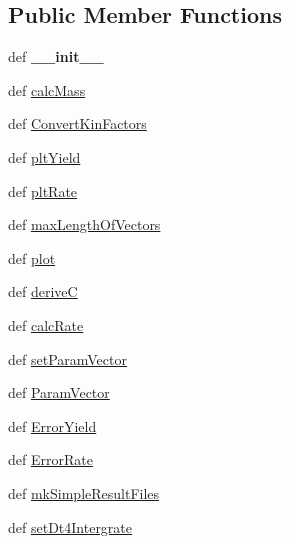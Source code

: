 \subsection*{\-Public \-Member \-Functions}
\begin{DoxyCompactItemize}
\item 
\hypertarget{classModels_1_1ArrheniusModelNoB_ad0a055e1a0bd58308116136d54d16ffb}{def {\bfseries \-\_\-\-\_\-init\-\_\-\-\_\-}}\label{classModels_1_1ArrheniusModelNoB_ad0a055e1a0bd58308116136d54d16ffb}

\item 
def \hyperlink{classModels_1_1ArrheniusModelNoB_ad6e29a334e64d65beb7b0785b2979644}{calc\-Mass}
\item 
def \hyperlink{classModels_1_1ArrheniusModelNoB_a6c26a473f8e08dd6d6651dd0b7c7a8a5}{\-Convert\-Kin\-Factors}
\item 
def \hyperlink{classModels_1_1Model_a317ed848b969dbe3a96dd05e8b771900}{plt\-Yield}
\item 
def \hyperlink{classModels_1_1Model_aa35c741babf8f141df48c4021e0664e4}{plt\-Rate}
\item 
def \hyperlink{classModels_1_1Model_a3396d6ca1a7b7d66e55ada8c3c7a509e}{max\-Length\-Of\-Vectors}
\item 
def \hyperlink{classModels_1_1Model_ae404a691e48bfe4eafcdfdd09f1dae48}{plot}
\item 
def \hyperlink{classModels_1_1Model_a010945ed2adff59a7a5fce36025e7a97}{derive\-C}
\item 
def \hyperlink{classModels_1_1Model_a7c9280e33f9e0d46703cebc131008c65}{calc\-Rate}
\item 
def \hyperlink{classModels_1_1Model_a818f207e2a4bd0e9a3720ca611960e5a}{set\-Param\-Vector}
\item 
def \hyperlink{classModels_1_1Model_a13c76a0fe24d43cdc4d21fbc73fa96fa}{\-Param\-Vector}
\item 
def \hyperlink{classModels_1_1Model_ad3e627980d9e781bf7b2c9ff900ca06b}{\-Error\-Yield}
\item 
def \hyperlink{classModels_1_1Model_a3050eb39341f318d8d88b172f88bd240}{\-Error\-Rate}
\item 
def \hyperlink{classModels_1_1Model_adcb987bccae63a742490ea1e6d5f7a74}{mk\-Simple\-Result\-Files}
\item 
def \hyperlink{classModels_1_1Model_ac28252ae5cd6b5ecd4c5d006a0e6567d}{set\-Dt4\-Intergrate}
\end{DoxyCompactItemize}

